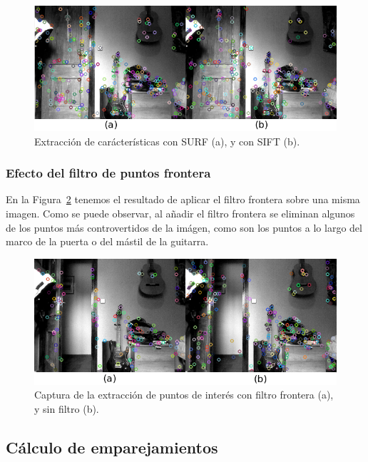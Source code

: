 \begin{figure}[th]
\centering
\includegraphics[scale=0.6]{Figures/tests/sift-surf.png}
\decoRule
\caption[Extracción de carácterísticas con SURF y con SIFT]{Extracción de carácterísticas con SURF (a), y con SIFT (b).}
\label{fig:sift-surf}
\end{figure}

\subsubsection{Efecto del filtro de puntos frontera}

En la Figura~\ref{fig:borderfilter} tenemos el resultado de aplicar el filtro frontera sobre una misma imagen. Como se puede observar, al añadir el filtro frontera se eliminan algunos de los puntos más controvertidos de la imágen, como son los puntos a lo largo del marco de la puerta o del mástil de la guitarra.

\begin{figure}[th]
\centering
\includegraphics[scale=0.7]{Figures/tests/borderfilter.png}
\decoRule
\caption[Captura de la extracción de puntos de interés con filtro frontera]{Captura de la extracción de puntos de interés con filtro frontera (a), y sin filtro (b).}
\label{fig:borderfilter}
\end{figure}

\subsection{Cálculo de emparejamientos}


